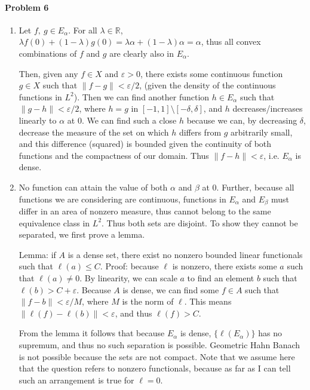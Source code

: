 \documentclass[12pt]{article}
\begin{document}
\paragraph{Problem 6}
\begin{enumerate}[label=(\alph*)]
\item 
  Let $f,\ g \in E_\alpha$. For all $\lambda \in \mathbb{R}$, $\lambda f(0) +
  (1-\lambda)g(0) = \lambda \alpha + (1-\lambda) \alpha = \alpha$, thus all
  convex combinations of $f$ and $g$ are clearly also in $E_\alpha$.

  Then, given
  any $f \in X$ and $\varepsilon > 0$, there exists some continuous function
  $g \in X$ such that $\|f - g\| < \varepsilon/2$, (given the density of the
  continuous functions in $L^2$). Then we can find another function $h \in E_\alpha
  $ such that $\|g-h\| < \varepsilon/2$, where $h = g$ in $[-1,1]\setminus [-\delta
  ,\delta]$, and $h$ decreases/increases linearly to $\alpha$ at $0$. We can find
  such a close $h$ because we can, by decreasing $\delta$, decrease the measure
  of the set on which $h$ differs from $g$ arbitrarily small, and this difference
  (squared) is bounded given the continuity of both functions and the compactness
  of our domain. Thus $\|f-h\| < \varepsilon$, i.e. $E_\alpha$ is dense.
\item No function can attain the value of both $\alpha$ and $\beta$ at 0. Further,
  because all functions we are considering are continuous, functions in $E_\alpha$
  and $E_\beta$ must differ in an area of nonzero measure, thus cannot belong to
  the same equivalence class in $L^2$. Thus both sets are disjoint. To show they
  cannot be separated, we first prove a lemma.

  Lemma: if $A$ is a dense set, there exist no nonzero bounded linear functionals
  such that $\ell(a) \leq C$. Proof: because $\ell$ is nonzero, there exists some
  $a$ such that $\ell(a) \neq 0$. By linearity, we can scale $a$ to find an element
  $b$ such that $\ell(b) > C + \varepsilon$. Because $A$ is dense, we can find some
  $f\in A$ such that $\|f - b\| < \varepsilon/M$, where $M$ is the norm of $\ell$.
  This means $\|\ell(f) - \ell(b)\| < \varepsilon$, and thus $\ell(f) > C$.

  From the lemma it follows that because $E_\alpha$ is dense, $\{\ell(E_\alpha)\}$
  has no supremum, and thus no such separation is possible. Geometric Hahn Banach
  is not possible because the sets are not compact. Note that we assume here that the
  question refers to nonzero functionals, because as far as I can tell such an
  arrangement is true for $\ell = 0$.
  
\end{enumerate}
\end{document}
